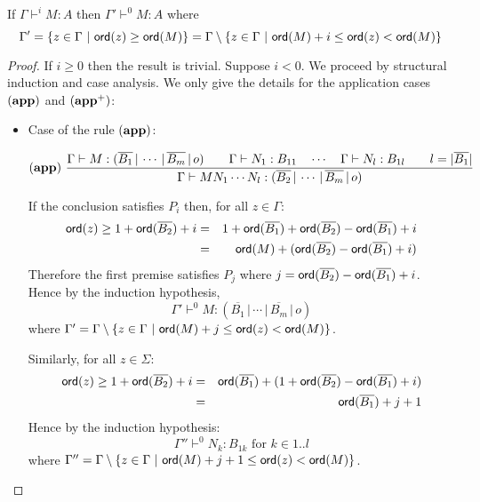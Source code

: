 \begin{lem}
\label{lem:restriction}

If $\Gamma \vdash^i M : A$ then $\Gamma' \vdash^{0} M : A$
where $$\Gamma' = \{ z \in \Gamma \ |
\ \ord{z} \geq \ord{M} \} = \Gamma \setminus \{ z \in \Gamma \ | \ \ord{M} + i \leq \ord{z} < \ord{M} \}$$
\end{lem}
\begin{proof}
If $i\geq 0$ then the result is trivial. Suppose $i<0$. We proceed
by structural induction and case analysis. We only give the details
for the application cases $\mathbf{(app)}$ and $\mathbf{(app^+)}$:
\begin{itemize}
\item Case of the rule $\mathbf{(app)}$:

    \[ (\mathbf{app}) \
    \frac{\displaystyle {{\Gamma} \vdash {M : (\overline{B_1} \, | \, \cdots \, | \, \overline{B_m} \, | \, o)}} \qquad
            {{\Gamma} \vdash {N_1 : B_{11}}} \quad \cdots \quad {{\Gamma} \vdash {N_{l} :
            B_{1l}}} \qquad l = |\overline{B_1}| }{ {{\Gamma} \vdash {M N_1
            \cdots N_{l} : (\overline{B_2} \, | \, \cdots \, | \,
            \overline{B_m} \, | \, o)}}}
    \]

    If the conclusion satisfies $P_i$ then, for all $z \in \Gamma$:
    \begin{eqnarray*}
    {\sf ord}(z) \geq 1 + {\sf ord}(\overline{B_2}) + i
    &=& 1 + {\sf ord}(\overline{B_1}) + {\sf ord}(\overline{B_2}) - {\sf ord}(\overline{B_1}) + i \\
    &=& {\sf ord}(M) + ({\sf ord}(\overline{B_2}) - {\sf ord}(\overline{B_1}) + i)
    \end{eqnarray*}
    Therefore the first premise satisfies $P_j$ where $j={{\sf ord}(\overline{B_2}) - {\sf ord}(\overline{B_1}) + i}$.
    Hence by the induction hypothesis,
    $$\Gamma' \vdash^{0} M : (\overline{B_1} \, | \, \cdots \, | \, \overline{B_m} \, | \, o)$$
    where $\Gamma' = \Gamma \setminus \{ z \in \Gamma \ | \ {\sf ord}(M) + j \leq {\sf ord}(z) < {\sf ord}(M) \}$.


    Similarly, for all $z \in \Sigma$:
    \begin{eqnarray*}
    {\sf ord}(z) \geq 1 + {\sf ord}(\overline{B_2}) + i
    &=& {\sf ord}(\overline{B_1}) + (1+{\sf ord}(\overline{B_2}) - {\sf ord}(\overline{B_1}) + i) \\
    &=& {\sf ord}(\overline{B_1}) + j+1
    \end{eqnarray*}
    Hence by the induction hypothesis:
    $$\Gamma'' \vdash^0 N_k : B_{1k} \mbox{ for } k \in 1..l$$
    where $\Gamma'' = \Gamma \setminus \{ z \in \Gamma \ | \ {\sf ord}(M) + j+1 \leq {\sf ord}(z) < {\sf ord}(M) \}$.


\end{itemize}
\end{proof}
